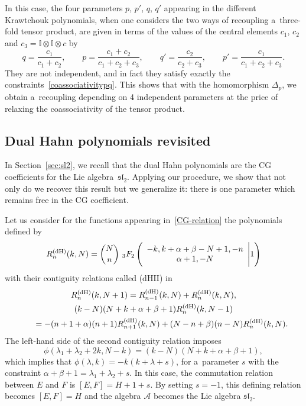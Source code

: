 \documentclass[pdftex]{sigma}
\numberwithin{equation}{section}
\theoremstyle{definition}
\begin{document}
In this case, the four parameters $p$, $p'$, $q$, $q'$ appearing in the different Krawtchouk polynomials, when one considers the two ways of recoupling a~three-fold tensor product, are given in terms of the values of the central elements $c_1$, $c_2$ and $c_3=\mathbb{I}\otimes\mathbb{I}\otimes c$ by
\[q=\frac{c_1}{c_1+c_2}, \qquad p=\frac{c_1+c_2}{c_1+c_2+c_3}, \qquad q'=\frac{c_2}{c_2+c_3}, \qquad p'=\frac{c_1}{c_1+c_2+c_3}.\]
They are not independent, and in fact they satisfy exactly the constraints~\eqref{coassociativitypq}. This shows that with the homomorphism $\Delta_p$, we obtain a~recoupling depending on 4 independent parameters at the price of relaxing the coassociativity of the tensor product.

\subsection{Dual Hahn polynomials revisited}

In Section~\ref{sec:sl2}, we recall that the dual Hahn polynomials are the CG coefficients for the Lie algebra~$\mathfrak{sl}_2$.
Applying our procedure, we show that not only do we recover this result but we generalize it: there is one parameter which remains free in the CG coefficient.

Let us consider for the functions appearing in~\eqref{CG-relation} the polynomials defined by
\[
R^{\rm (dH)}_n(k,N)=\binom{N}{n}\ {}_3F_2\left(\begin{array}{c} -k, k+\alpha+\beta-N+1, -n \\ \alpha+1, -N\end{array}\Bigg\vert 1\right)
\]
with their contiguity relations called (dHII) in~\cite{contiguity}
\begin{gather*}
R^{\rm (dH)}_n(k,N+1)=R^{\rm (dH)}_{n-1}(k,N)+R^{\rm (dH)}_n(k,N),\\
(k-N)(N+k+\alpha+\beta+1)R^{\rm (dH)}_n(k,N-1)\nonumber\\
\qquad=-(n+1+\alpha)(n+1)R^{\rm (dH)}_{n+1}(k,N)+(N-n+\beta)(n-N)R^{\rm (dH)}_n(k,N).
\end{gather*}
The left-hand side of the second contiguity relation imposes
\[\phi(\lambda_1+\lambda_2+2k,N-k)=(k-N)(N+k+\alpha+\beta+1),\]
which implies that
$\phi(\lambda,k)=-k(k+\lambda+s)$,
for a~parameter $s$ with the constraint
$\alpha+\beta+1=\lambda_1+\lambda_2+s$.
In this case, the commutation relation between $E$ and $F$ is
$ [E,F]=H+1+s$.
By setting $s=-1$, this defining relation becomes $[E,F]=H$ and the algebra $\mathcal{A}$ becomes the Lie algebra $\mathfrak{sl}_2$.
\end{document}
